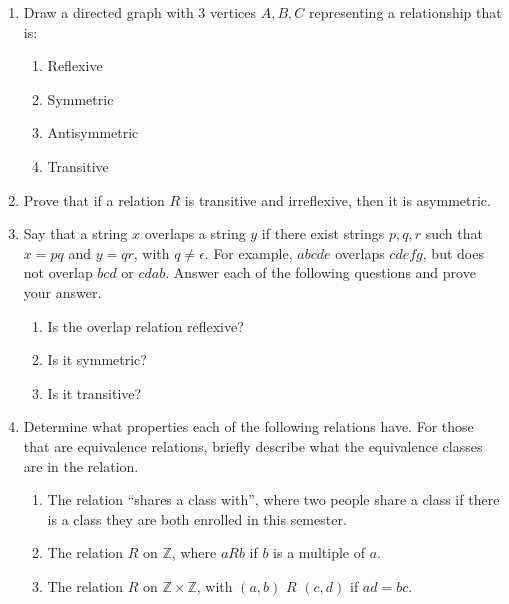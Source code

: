\documentclass[12pt]{article}
\begin{document}
\begin{enumerate}
\item Draw a directed graph with 3 vertices $A, B, C$ representing a relationship that is:
\begin{enumerate}
\item Reflexive
\item Symmetric
\item Antisymmetric
\item Transitive
\end{enumerate}
\item Prove that if a relation $R$ is transitive and irreflexive, then it is asymmetric.
\item Say that a string $x$ overlaps a string $y$ if there exist strings $p,q,r$ such that $x = pq$ and $y = qr$, with $q \neq \epsilon$. For example, $abcde$ overlaps $cdefg$, but does not overlap $bcd$ or $cdab$. Answer each of the following questions and prove your answer.
\begin{enumerate}
\item Is the overlap relation reflexive?
\item Is it symmetric?
\item Is it transitive?
\end{enumerate}
\item Determine what properties each of the following relations have. For those that are equivalence relations, briefly describe what the equivalence classes are in the relation.
\begin{enumerate}
\item The relation ``shares a class with'', where two people share a class if there is a class they are both enrolled in this semester.
\item The relation $R$ on $\mathbb{Z}$, where $aRb$ if $b$ is a multiple of $a$.
\item The relation $R$ on $\mathbb{Z} \times \mathbb{Z}$, with $(a,b)$ $R$ $(c,d)$ if $ad = bc$. 
\end{enumerate}
\iffalse
\item Recall that any weak partial order is $D^*$ for some DAG $D$. Let the weak partial order divisibility ($a|b$ means $b$ is divisible by $a$) be $D^*$.
\begin{enumerate}
\item Draw the corresponding DAG for vertices $\{1, 2, ... 12\}$, where an edge from $a$ to $b$ means that $a|b$. Use as few edges as possible.
\item Add the vertex $24$ to this graph. What is the smallest number of additional edges you need to do this?
\end{enumerate}
\fi
\end{enumerate}
\pagebreak
\end{document}
